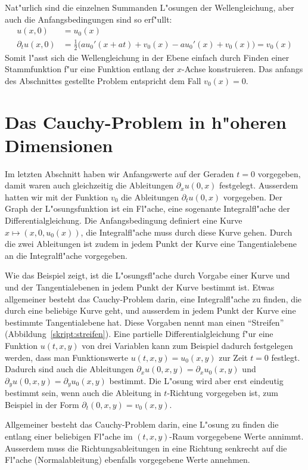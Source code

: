 Nat"urlich sind die einzelnen Summanden L"osungen der Wellengleichung, aber auch
die Anfangsbedingungen sind so erf"ullt:
\begin{align*}
u(x,0)&=u_0(x)\\
\partial_tu(x,0)&=\frac12\bigl(au_0'(x+at)+v_0(x)-au_0'(x)+v_0(x)\bigr) =v_0(x)
\end{align*}
Somit l"asst sich die Wellengleichung in der Ebene einfach durch Finden einer
Stammfunktion f"ur eine Funktion entlang der $x$-Achse konstruieren.
Das anfangs des Abschnittes
gestellte Problem entspricht dem Fall $v_0(x)=0$.

\section{Das Cauchy-Problem in h"oheren Dimensionen}
Im letzten Abschnitt haben wir Anfangswerte auf der Geraden $t=0$
vorgegeben, damit waren auch gleichzeitig die Ableitungen 
$\partial_x u(0,x)$ festgelegt. Ausserdem hatten wir mit der Funktion $v_0$
die Ableitungen $\partial_t u(0,x)$ vorgegeben.
Der Graph der L"osungsfunktion ist ein Fl"ache, eine sogenante
Integralfl"ache der Differentialgleichung. Die Anfangsbedingung
definiert eine Kurve $x\mapsto(x,0,u_0(x))$, die Integralfl"ache muss
durch diese Kurve gehen.
Durch die zwei Ableitungen ist zudem in jedem Punkt der Kurve
eine Tangentialebene an die Integralfl"ache vorgegeben.

Wie das Beispiel zeigt, ist die L"osungsfl"ache durch Vorgabe einer Kurve und
und der Tangentialebenen in jedem Punkt der Kurve bestimmt ist.
Etwas allgemeiner besteht das Cauchy-Problem darin, eine Integralfl"ache
zu finden, die durch eine beliebige Kurve geht, und ausserdem in jedem Punkt
der Kurve eine bestimmte Tangentialebene hat. Diese Vorgaben nennt man
einen ``Streifen'' (Abbildung~\ref{skript:streifen}).
Eine partielle Differentialgleichung f"ur eine Funktion $u(t,x,y)$
von drei Variablen kann zum Beispiel dadurch festgelegen werden,
dass man Funktionswerte $u(t,x,y)=u_0(x,y)$ zur Zeit $t=0$ festlegt.
Dadurch sind auch die Ableitungen $\partial_x u(0,x,y)=\partial_xu_0(x,y)$
und $\partial_y u(0,x,y)=\partial_y u_0(x,y)$ bestimmt. Die L"osung wird
aber erst eindeutig bestimmt sein, wenn auch die Ableitung in $t$-Richtung
vorgegeben ist, zum Beispiel in der Form $\partial_t(0,x,y)=v_0(x,y)$.

Allgemeiner besteht das Cauchy-Problem darin, eine L"osung zu finden
die entlang einer beliebigen Fl"ache im $(t,x,y)$-Raum vorgegebene
Werte annimmt. Ausserdem muss die Richtungsableitungen in eine Richtung
senkrecht auf die Fl"ache (Normalableitung) ebenfalls vorgegebene Werte annehmen.


